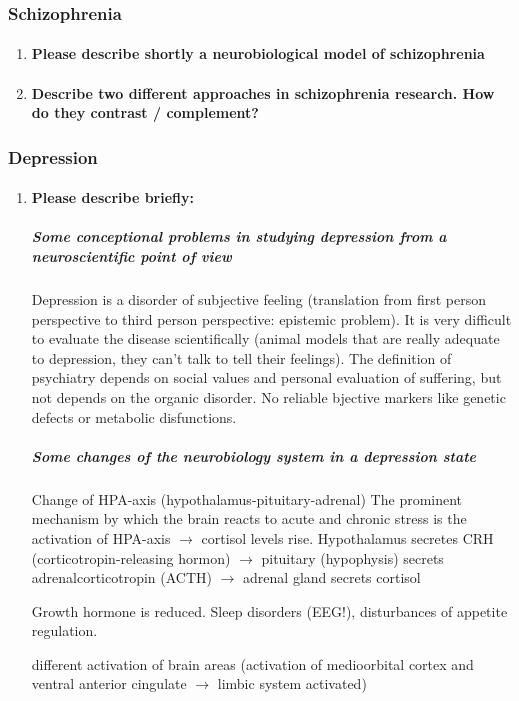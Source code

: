\documentclass[12pt,article,oneside,a4paper]{memoir}
\begin{document}
\subsubsection{Schizophrenia}
\begin{enumerate}
\item \paragraph{Please describe shortly a neurobiological model of schizophrenia}

\item \paragraph{Describe two different approaches in schizophrenia research. How do they contrast / complement?}
\end{enumerate}

\subsubsection{Depression}
\begin{enumerate}
\item \paragraph{Please describe briefly:}
\subparagraph{Some conceptional problems in studying depression from a neuroscientific point of view} 

Depression is a disorder of subjective feeling (translation from first person perspective to third person perspective: epistemic problem). It is very difficult to evaluate the disease scientifically (animal models that are really adequate to depression, they can’t talk to tell their feelings). The definition of psychiatry depends on social values and personal evaluation of suffering, but not depends on the organic disorder. No reliable bjective markers like genetic defects or metabolic disfunctions.

\subparagraph{Some changes of the neurobiology system in a depression state}
Change of HPA-axis (hypothalamus-pituitary-adrenal)
	The prominent mechanism by which the brain reacts to acute and chronic stress is the activation of HPA-axis $\rightarrow$ cortisol levels rise.
		Hypothalamus secretes CRH (corticotropin-releasing hormon) $\rightarrow$ pituitary (hypophysis) secrets adrenalcorticotropin (ACTH) $\rightarrow$ adrenal gland secrets cortisol

Growth hormone is reduced.
	Sleep disorders (EEG!), disturbances of appetite regulation.

different activation of brain areas (activation of medioorbital cortex and ventral anterior cingulate $\rightarrow$ limbic system activated)

\end{enumerate}
\end{document}
